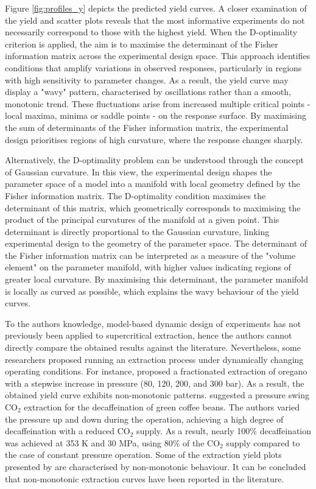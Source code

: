 \documentclass[a4paper,fleqn]{cas-dc}
\begin{document}
		Figure \ref{fig:profiles_y} depicts the predicted yield curves. A closer examination of the yield and scatter plots reveals that the most informative experiments do not necessarily correspond to those with the highest yield. When the D-optimality criterion is applied, the aim is to maximise the determinant of the Fisher information matrix across the experimental design space. This approach identifies conditions that amplify variations in observed responses, particularly in regions with high sensitivity to parameter changes. As a result, the yield curve may display a "wavy" pattern, characterised by oscillations rather than a smooth, monotonic trend. These fluctuations arise from increased multiple critical points - local maxima, minima or saddle points - on the response surface. By maximising the sum of determinants of the Fisher information matrix, the experimental design prioritises regions of high curvature, where the response changes sharply. 
		
		Alternatively, the D-optimality problem can be understood through the concept of Gaussian curvature. In this view, the experimental design shapes the parameter space of a model into a manifold with local geometry defined by the Fisher information matrix. The D-optimality condition maximises the determinant of this matrix, which geometrically corresponds to maximising the product of the principal curvatures of the manifold at a given point. This determinant is directly proportional to the Gaussian curvature, linking experimental design to the geometry of the parameter space. The determinant of the Fisher information matrix can be interpreted as a measure of the "volume element" on the parameter manifold, with higher values indicating regions of greater local curvature. By maximising this determinant, the parameter manifold is locally as curved as possible, which explains the wavy behaviour of the yield curves.
		
		To the authors knowledge, model-based dynamic design of experiments has not previously been applied to supercritical extraction, hence the authors cannot directly compare the obtained results against the literature. Nevertheless, some researchers proposed running an extraction process under dynamically changing operating conditions. For instance, \citet{Simandi1998} proposed a fractionated extraction of oregano with a stepwise increase in pressure (80, 120, 200, and 300 bar). As a result, the obtained yield curve exhibits non-monotonic patterns. \citet{Hiraga2025} suggested a pressure swing CO$_2$ extraction for the decaffeination of green coffee beans. The authors varied the pressure up and down during the operation, achieving a high degree of decaffeination with a reduced CO$_2$ supply. As a result, nearly 100\% decaffeination was achieved at 353 K and 30 MPa, using 80\% of the CO$_2$ supply compared to the case of constant pressure operation. Some of the extraction yield plots presented by \citet{Hiraga2025} are characterised by non-monotonic behaviour. It can be concluded that non-monotonic extraction curves have been reported in the literature.
		
\end{document}
